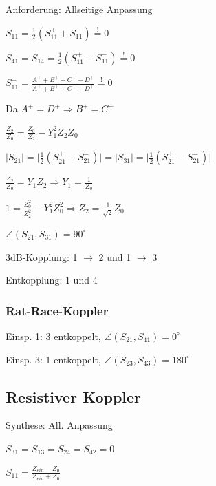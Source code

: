 Anforderung: Allseitige Anpassung
\begin{pitemize}
    \item $S_{11} = \frac{1}{2}(S_{11}^+ + S_{11}^-) \overset{!}{=} 0$
    \item $S_{41} = S_{14} = \frac{1}{2}(S_{11}^+ - S_{11}^-) \overset{!}{=} 0$
    \item $S_{11}^+ = \frac{A^+ + B^+ - C^+ - D^+}{A^+ + B^+ + C^+ + D^+} \overset{!}{=} 0$
    \item Da $A^+ = D^+ \Rightarrow B^+ = C^+$
    \item $\frac{Z_2}{Z_0} = \frac{Z_0}{Z_2} - Y_1^2 Z_2 Z_0$
    \item $|S_{21}| = \lvert\frac{1}{2} \left(S_{21}^+ + S_{21}^-\right)\rvert = |S_{31}| = \lvert\frac{1}{2} \left(S_{21}^+ - S_{21}^-\right)\rvert$
    \item $\frac{Z_2}{Z_0} = Y_1 Z_2 \Rightarrow Y_1 = \frac{1}{Z_0}$
    \item $1 = \frac{Z_0^2}{Z_2^2} - Y_1^2Z_0^2 \Rightarrow Z_2 = \frac{1}{\sqrt{2}}Z_0$
\end{pitemize}

\begin{pitemize}
    \item $\angle(S_{21}, S_{31}) = 90^\circ$
    \item 3dB-Kopplung: 1 $\rightarrow$ 2 und 1 $\rightarrow$ 3
    \item Entkopplung: 1 und 4
\end{pitemize}


\subsubsection{Rat-Race-Koppler}
\begin{pitemize}
    \item Einsp. 1: 3 entkoppelt, $\angle(S_{21}, S_{41}) = 0^\circ$
    \item Einsp. 3: 1 entkoppelt, $\angle(S_{23}, S_{43}) = 180^\circ$
\end{pitemize}








\subsection{Resistiver Koppler}

Synthese: All. Anpassung
\begin{pitemize}
    \item $S_{31} = S_{13} = S_{24} = S_{42} = 0$
\end{pitemize}
$S_{11} = \frac{Z_{ein} -Z_0}{Z_{ein} + Z_0}$

